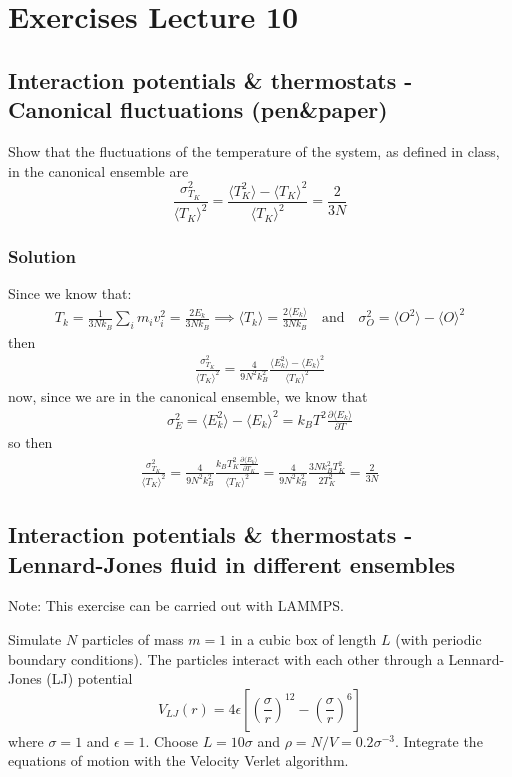\documentclass[../main.tex]{subfiles}
\begin{document}
\chapter{Exercises Lecture 10}


\section{Interaction potentials \& thermostats - Canonical fluctuations (pen\&paper)}
Show that the fluctuations of the temperature of the system, as defined in class, in the canonical ensemble are
\[
\frac{\sigma_{T_K}^2}{\langle T_K \rangle^2} = \frac{\langle T_K^2 \rangle - \langle T_K \rangle^2}{\langle T_K \rangle^2} = \frac{2}{3N}
\]

\subsection{Solution}
Since we know that:
\begin{align}
    T_k = \frac{1}{3Nk_B}\sum_i m_iv_i^2 = \frac{2E_k}{3Nk_B} \implies \langle T_k\rangle = \frac{2\langle E_k \rangle}{3Nk_B}\quad \text{and}\quad \sigma_O^2 = \langle O^2 \rangle - \langle O \rangle^2
\end{align} then
\begin{align}
   \frac{\sigma_{T_K}^2}{\langle T_K \rangle^2} = \frac{4}{9N^2 k_B^2}\frac{\langle E_k^2 \rangle - \langle E_k \rangle^2}{\langle T_K \rangle^2}
\end{align} now, since we are in the canonical ensemble, we know that
\begin{align}
    \sigma^2_E = \langle E_k^2 \rangle - \langle E_k \rangle^2 = k_BT^2\frac{\partial  \langle E_k \rangle}{\partial T} 
\end{align}so then
\begin{align}
   \frac{\sigma_{T_K}^2}{\langle T_K \rangle^2} = \frac{4}{9N^2 k_B^2}\frac{k_BT_K^2\frac{\partial  \langle E_k \rangle}{\partial T_K} }{\langle T_K \rangle^2} = \frac{4}{9N^2 k_B^2} \frac{3Nk_B^2T_K^2}{2T_K^2} = \frac{2}{3N}
\end{align}
\newpage

\section{Interaction potentials \& thermostats - Lennard-Jones fluid in different ensembles}
Note: This exercise can be carried out with LAMMPS.

Simulate $N$ particles of mass $m=1$ in a cubic box of length $L$ (with periodic boundary conditions). The particles interact with each other through a Lennard-Jones (LJ) potential
\[
V_{LJ}(r) = 4\epsilon \left[ \left( \frac{\sigma}{r} \right)^{12} - \left( \frac{\sigma}{r} \right)^{6} \right]
\]
where $\sigma = 1$ and $\epsilon = 1$. Choose $L=10\sigma$ and $\rho = N/V = 0.2\sigma^{-3}$. Integrate the equations of motion with the Velocity Verlet algorithm.
\end{document}
